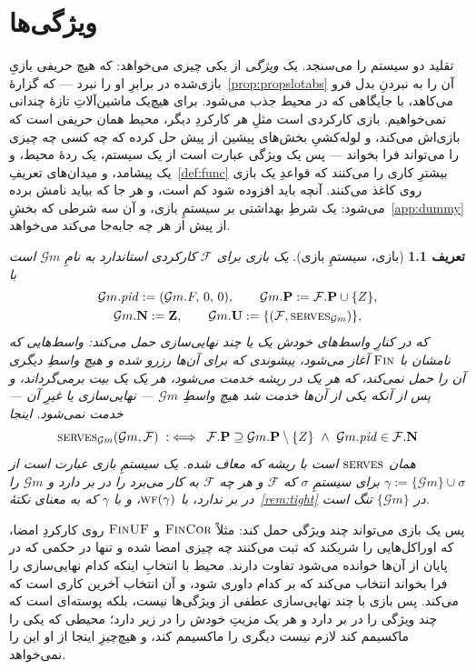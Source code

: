 \documentclass[10pt,oneside,openany]{book}
\newcommand{\Ps}{\mathbf{P}}
\newcommand{\PID}{\mathit{pid}}
\newcommand{\admits}{\mathbf{N}}
\newcommand{\Zpid}{\mathbf{Z}}
\newcommand{\uses}{\mathbf{U}}
\newcommand{\serves}{\op{serves}}
\newcommand{\WF}{\op{wf}}
\newcommand{\F}{\mathcal{F}}
\newcommand{\op}[1]{\textnormal{\textsc{#1}}}
\newcommand{\Gm}{\mathcal{G}m}
\theoremstyle{accentdef}
\newtheorem{definition}{تعریف}[chapter]
\theoremstyle{accentplain}
\begin{document}
\chapter{ویژگی‌ها}\label{sec:properties}

تقلید دو سیستم را می‌سنجد. یک \emph{ویژگی} از یکی چیزی می‌خواهد: که هیچ
حریفی بازیِ بازی‌شده در برابرِ او را نبرد --- که
گزارهٔ~\ref{prop:propslotabs} آن را به نبردنِ بدل فرو می‌کاهد، با جایگاهی
که در محیط جذب می‌شود. برای هیچ‌یک ماشین‌آلاتِ تازهٔ چندانی نمی‌خواهیم. بازی
کارکردی است مثلِ هر کارکردِ دیگر، محیط همان حریفی است که بازی‌اش می‌کند، و
لوله‌کشیِ بخش‌های پیشین از پیش حل کرده که چه کسی چه چیزی را می‌تواند فرا
بخواند --- پس یک ویژگی عبارت است از یک سیستم، یک ردهٔ محیط، و یک پیشامد، و
میدان‌های تعریفِ~\ref{def:func} بیشترِ کاری را می‌کنند که قواعدِ یک بازی
روی کاغذ می‌کنند. آنچه باید افزوده شود کم است، و هر جا که بیاید نامش برده
می‌شود: یک شرطِ بهداشتی بر سیستمِ بازی، و آن سه شرطی که
بخشِ~\ref{app:dummy} از پیش از هر چه جابه‌جا می‌کند می‌خواهد.

\begin{definition}[بازی، سیستمِ بازی]\label{def:prop}
یک \emph{بازی} برای $\F$ کارکردی استاندارد به نامِ $\Gm$ است با
\[
  \begin{gathered}
  \Gm.\PID := (\Gm.F,\,0,\,0), \qquad
  \Gm.\Ps := \F.\Ps \cup \{Z\}, \\
  \Gm.\admits := \Zpid, \qquad
  \Gm.\uses := \{(\F,\serves_{\Gm})\} ,
  \end{gathered}
\]
که در کنارِ واسط‌های خودش یک یا چند \emph{نهایی‌سازی} حمل می‌کند: واسط‌هایی
که نامشان با $\op{Fin}$ آغاز می‌شود، پیشوندی که برای آن‌ها رزرو شده و هیچ
واسطِ دیگری آن را حمل نمی‌کند، که هر یک در ریشه خدمت می‌شود، هر یک یک بیت
برمی‌گرداند، و پس از آنکه یکی از آن‌ها خدمت شد هیچ واسطِ $\Gm$ ---
نهایی‌سازی یا غیرِ آن --- خدمت نمی‌شود. اینجا
\[
  \serves_{\Gm}(\Gm,\F) \;:\iff\; \F.\Ps \supseteq \Gm.\Ps \setminus \{Z\}
  \ \wedge\ \Gm.\PID \in \F.\admits
\]
همان $\serves$ است با ریشه که معاف شده. یک \emph{سیستمِ بازی} عبارت است از
$\gamma := \{\Gm\} \cup \sigma$ برای سیستمِ $\sigma$ که $\F$ و هر چه $\F$
به کار می‌برد را در بر دارد و $\Gm$ را در بر ندارد، با $\WF(\gamma)$، و با
$\gamma$ که به معنای نکتهٔ~\ref{rem:tight} در $\{\Gm\}$ \emph{تنگ} است.
\end{definition}

پس یک بازی می‌تواند چند ویژگی حمل کند: مثلاً $\op{FinCor}$ و $\op{FinUF}$
روی کارکردِ امضا، که اوراکل‌هایی را شریکند که ثبت می‌کنند چه چیزی امضا شده
و تنها در حکمی که در پایان از آن‌ها خوانده می‌شود تفاوت دارند. محیط با
انتخابِ اینکه کدام نهایی‌سازی را فرا بخواند انتخاب می‌کند که بر کدام داوری
شود، و آن انتخاب آخرین کاری است که می‌کند. پس بازی با چند نهایی‌سازی
عطفی از ویژگی‌ها نیست، بلکه پوسته‌ای است که چند ویژگی را در بر دارد و هر
یک مزیتِ خودش را در زیر دارد؛ محیطی که یکی را ماکسیمم کند لازم نیست دیگری
را ماکسیمم کند، و هیچ‌چیزِ اینجا از او این را نمی‌خواهد.
\end{document}
